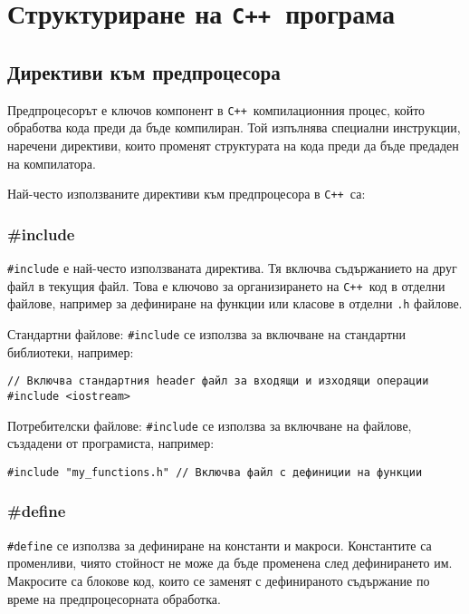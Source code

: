 \documentclass[oneside]{book}
\newcommand*{\code}[1]{\texttt{#1}}
\newcommand*{\cpp}{\texttt{C++}\ }
\begin{document}
\section{Структуриране на \cpp програма}
\subsection{Директиви към предпроцесора}
Предпроцесорът е ключов компонент в \cpp компилационния процес, който обработва кода преди да бъде компилиран. Той изпълнява специални инструкции, наречени директиви, които променят структурата на кода преди да бъде предаден на компилатора.

Най-често използваните директиви към предпроцесора в \cpp са:

\subsubsection{\#include}
\code{\#include} е най-често използваната директива. Тя включва съдържанието на друг файл в текущия файл. Това е ключово за организирането на \cpp код в отделни файлове, например за дефиниране на функции или класове в отделни \code{.h} файлове.

Стандартни файлове: \code{\#include} се използва за включване на стандартни библиотеки, например:
\begin{mdframed}\begin{lstlisting}
// Включва стандартния header файл за входящи и изходящи операции
#include <iostream>
\end{lstlisting}\end{mdframed}

Потребителски файлове: \code{\#include} се използва за включване на файлове, създадени от програмиста, например:
\begin{mdframed}\begin{lstlisting}
#include "my_functions.h" // Включва файл с дефиниции на функции
\end{lstlisting}\end{mdframed}

\subsubsection{\#define}
\code{\#define} се използва за дефиниране на константи и макроси. Константите са променливи, чиято стойност не може да бъде променена след дефинирането им. Макросите са блокове код, които се заменят с дефинираното съдържание по време на предпроцесорната обработка.
\end{document}

